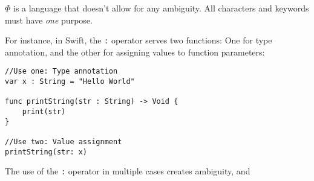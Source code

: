 \documentclass[../../main.tex]{subfiles}
\begin{document}
$\Phi$ is a language that doesn't allow for any ambiguity. All characters and keywords must have \textit{one} purpose.

For instance, in Swift, the \texttt{:} operator serves two functions: One for type annotation, and the other for assigning values to function parameters:

\begin{verbatim}
//Use one: Type annotation
var x : String = "Hello World"

func printString(str : String) -> Void {
    print(str)
}

//Use two: Value assignment
printString(str: x)
\end{verbatim}

The use of the \texttt{:} operator in multiple cases creates ambiguity, and 
\end{document}
